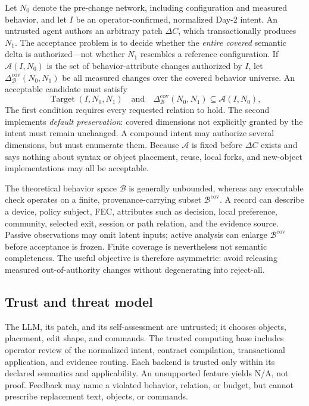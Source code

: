 \documentclass[conference]{IEEEtran}
\newcommand{\na}{\textsc{N/A}\xspace}
\begin{document}
Let $N_0$ denote the pre-change network, including configuration and measured
behavior, and let $I$ be an operator-confirmed, normalized Day-2 intent.  An untrusted agent
authors an arbitrary patch $\Delta C$, which transactionally produces $N_1$.
The acceptance problem is to decide whether the \emph{entire covered} semantic delta
is authorized---not whether $N_1$ resembles a reference configuration.  If
$\mathcal{A}(I,N_0)$ is the set of behavior-attribute changes authorized by
$I$, let $\Delta_{\mathcal B}^{\mathrm{cov}}(N_0,N_1)$ be all measured changes
over the covered behavior universe.  An acceptable candidate must satisfy
\begin{equation}
 \operatorname{Target}(I,N_0,N_1)\quad\text{and}\quad
 \Delta_{\mathcal B}^{\mathrm{cov}}(N_0,N_1)\subseteq
 \mathcal{A}(I,N_0),
 \label{eq:problem}
\end{equation}
The first condition requires every requested relation to hold.  The second
implements \emph{default preservation}: covered
dimensions not explicitly granted by the intent must remain unchanged.  A
compound intent may authorize several dimensions, but must enumerate them.
Because $\mathcal{A}$ is fixed before $\Delta C$ exists and says nothing about
syntax or object placement, reuse, local forks, and new-object implementations
may all be acceptable.

The theoretical behavior space $\mathcal B$ is generally unbounded, whereas
any executable check operates on a finite, provenance-carrying subset
$\mathcal B^{\mathrm{cov}}$.  A record can describe a device, policy subject,
FEC, attributes such as decision, local preference, community, selected exit,
session or path relation, and the evidence source.  Passive observations may
omit latent inputs; active analysis can enlarge $\mathcal B^{\mathrm{cov}}$
before acceptance is frozen.  Finite coverage is nevertheless not semantic
completeness.  The useful objective is therefore asymmetric: avoid releasing
measured out-of-authority changes without degenerating into reject-all.

\subsection{Trust and threat model}

The LLM, its patch, and its self-assessment are untrusted; it chooses objects,
placement, edit shape, and commands.  The trusted computing base includes
operator review of the normalized intent, contract compilation, transactional
application, and evidence routing.  Each backend is trusted only within its
declared semantics and applicability.  An unsupported feature yields \na, not
proof.  Feedback may name a violated behavior, relation, or budget, but cannot
prescribe replacement text, objects, or commands.
\end{document}
